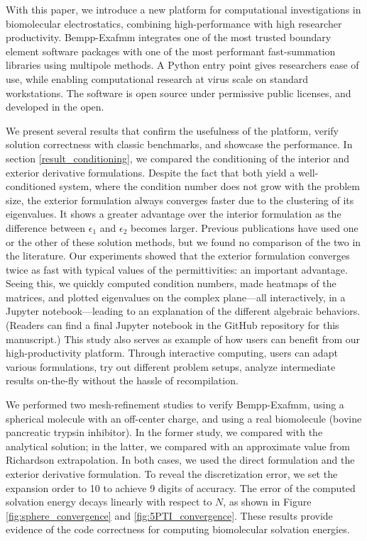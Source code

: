 With this paper, we introduce a new platform for computational investigations in biomolecular electrostatics, combining high-performance with high researcher productivity. 
Bempp-Exafmm integrates one of the most trusted boundary element software packages with one of the most performant fast-summation libraries using multipole methods. 
A Python entry point gives researchers ease of use, while enabling computational research at virus scale on standard workstations.
The software is open source under permissive public licenses, and developed in the open.

We present several results that confirm the usefulness of the platform, verify solution correctness with classic benchmarks, and showcase the performance. 
In section \ref{result_conditioning}, we compared the conditioning of the interior and exterior derivative formulations.
Despite the fact that both yield a well-conditioned system, where the condition number does not grow with the problem size, the exterior formulation always converges faster due to the clustering of its eigenvalues.
It shows a greater advantage over the interior formulation as the difference between $\epsilon_1$ and $\epsilon_2$ becomes larger.
Previous publications have used one or the other of these solution methods, but we found no comparison of the two in the literature.
Our experiments showed that the exterior formulation converges twice as fast with typical values of the permittivities: an important advantage.
Seeing this, we quickly computed condition numbers, made heatmaps of the matrices, and plotted eigenvalues on the complex plane---all interactively, in a Jupyter notebook---leading to an explanation of the different algebraic behaviors.
(Readers can find a final Jupyter notebook in the GitHub repository for this manuscript.)
This study also serves as example of how users can benefit from our high-productivity platform.
Through interactive computing, users can adapt various formulations, try out different problem setups, analyze intermediate results on-the-fly without the hassle of recompilation.

We performed two mesh-refinement studies to verify Bempp-Exafmm, using a spherical molecule with an off-center charge, and using a real biomolecule (bovine pancreatic trypsin inhibitor).
In the former study, we compared with the analytical solution; in the latter, we compared with an approximate value from Richardson extrapolation.
In both cases, we used the direct formulation and the exterior derivative formulation.
To reveal the discretization error, we set the \fmm expansion order to 10 to achieve 9 digits of accuracy.
The error of the computed solvation energy decays linearly with respect to $N$, as shown in Figure \ref{fig:sphere_convergence} and \ref{fig:5PTI_convergence}.
These results provide evidence of the code correctness for computing biomolecular solvation energies.

